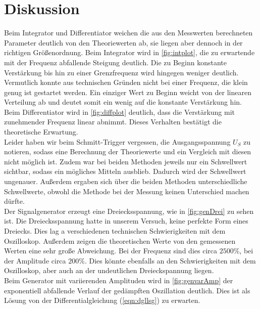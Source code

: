 \section{Diskussion}
\label{sec:Diskussion}


Beim Integrator und Differentiator weichen die aus den Messwerten berechneten Parameter deutlich von den Theoriewerten ab, sie liegen aber dennoch 
in der richtigen Größenordnung. Beim Integrator wird in \autoref{fig:intplot}, die zu erwartende mit der Frequenz abfallende Steigung deutlich. 
Die zu Beginn konstante Verstärkung bis hin zu einer Grenzfrequenz wird hingegen weniger deutlich. Vermutlich konnte aus technischen Gründen nicht 
bei einer Frequenz, die klein genug ist gestartet werden. Ein einziger Wert zu Beginn weicht von der linearen Verteilung ab und deutet somit ein 
wenig auf die konstante Verstärkung hin. Beim Differentiator wird in \autoref{fig:diffplot} deutlich, dass die Verstärkung mit zunehmender Frequenz linear 
abnimmt. Dieses Verhalten bestätigt die theoretische Erwartung.
\\
Leider haben wir beim Schmitt-Trigger vergessen, die Ausgangsspannung $U_S$ zu notieren, sodass eine Berechnung der Theoriewerte und ein Vergleich mit 
diesen nicht möglich ist. Zudem war bei beiden Methoden jeweils nur ein Schwellwert sichtbar, sodass ein mögliches Mitteln ausblieb. Dadurch wird 
der Schwellwert ungenauer. Außerdem ergaben sich über die beiden Methoden unterschiedliche Schwellwerte, obwohl die Methode bei der Messung 
keinen Unterschied machen dürfte.
\\
Der Signalgenerator erzeugt eine Dreiecksspannung, wie in \autoref{fig:genDrei} zu sehen ist. Die Dreiecksspannung hatte in unserem Versuch, 
keine perfekte Form eines Dreiecks. Dies lag a verschiedenen technischen Schwierigkeiten mit dem Oszilloskop. Außerdem zeigen die theoretischen Werte 
von den gemessenen Werten eine sehr große Abweichung. Bei der Frequenz sind dies circa $2500\%$, bei der Amplitude circa $200\%$. Dies könnte ebenfalls 
an den Schwierigkeiten mit dem Oszilloskop, aber auch an der undeutlichen Dreieckspannung liegen.
\\
Beim Generator mit variierenden Amplituden wird in \autoref{fig:genvarAmp} der exponentiell abfallende Verlauf der gedämpften Oszillation 
deutlich. Dies ist als Lösung von der Differentialgleichung (\autoref{eqn:dgllsg}) zu erwarten.